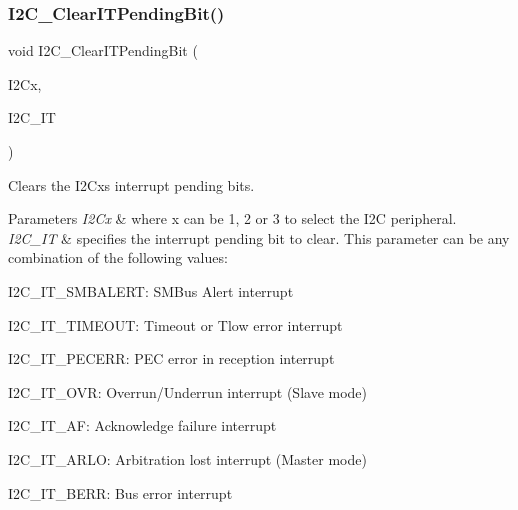 \subsubsection{\texorpdfstring{I2\+C\+\_\+\+Clear\+I\+T\+Pending\+Bit()}{I2C\_ClearITPendingBit()}}
{\footnotesize\ttfamily void I2\+C\+\_\+\+Clear\+I\+T\+Pending\+Bit (\begin{DoxyParamCaption}\item[{I2\+C\+\_\+\+Type\+Def $\ast$}]{I2\+Cx,  }\item[{uint32\+\_\+t}]{I2\+C\+\_\+\+IT }\end{DoxyParamCaption})}



Clears the I2\+Cx\textquotesingle{}s interrupt pending bits. 


\begin{DoxyParams}{Parameters}
{\em I2\+Cx} & where x can be 1, 2 or 3 to select the I2C peripheral. \\
\hline
{\em I2\+C\+\_\+\+IT} & specifies the interrupt pending bit to clear. This parameter can be any combination of the following values\+: \begin{DoxyItemize}
\item I2\+C\+\_\+\+I\+T\+\_\+\+S\+M\+B\+A\+L\+E\+RT\+: S\+M\+Bus Alert interrupt \item I2\+C\+\_\+\+I\+T\+\_\+\+T\+I\+M\+E\+O\+UT\+: Timeout or Tlow error interrupt \item I2\+C\+\_\+\+I\+T\+\_\+\+P\+E\+C\+E\+RR\+: P\+EC error in reception interrupt \item I2\+C\+\_\+\+I\+T\+\_\+\+O\+VR\+: Overrun/\+Underrun interrupt (Slave mode) \item I2\+C\+\_\+\+I\+T\+\_\+\+AF\+: Acknowledge failure interrupt \item I2\+C\+\_\+\+I\+T\+\_\+\+A\+R\+LO\+: Arbitration lost interrupt (Master mode) \item I2\+C\+\_\+\+I\+T\+\_\+\+B\+E\+RR\+: Bus error interrupt\end{DoxyItemize}
\\
\hline
\end{DoxyParams}
